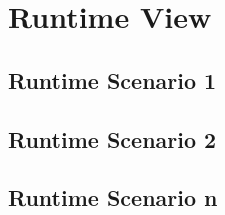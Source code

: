 \section{Runtime View}



\subsection{Runtime Scenario 1}

\subsection{Runtime Scenario 2}

\subsection{Runtime Scenario n}
